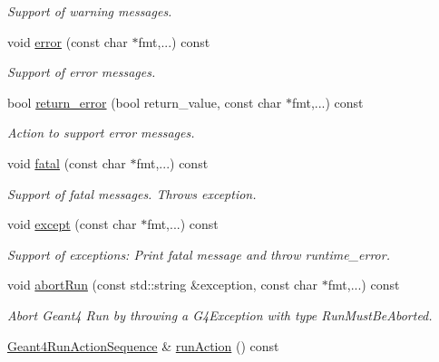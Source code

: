 \begin{DoxyCompactItemize}
\begin{DoxyCompactList}\small\item\em Support of warning messages. \end{DoxyCompactList}\item 
void \hyperlink{class_d_d4hep_1_1_simulation_1_1_geant4_action_a1abdae5d2d2af327f406697322b0d821}{error} (const char $\ast$fmt,...) const
\begin{DoxyCompactList}\small\item\em Support of error messages. \end{DoxyCompactList}\item 
bool \hyperlink{class_d_d4hep_1_1_simulation_1_1_geant4_action_a2f0ed49ced8246f3165476ed5866620a}{return\+\_\+error} (bool return\+\_\+value, const char $\ast$fmt,...) const
\begin{DoxyCompactList}\small\item\em Action to support error messages. \end{DoxyCompactList}\item 
void \hyperlink{class_d_d4hep_1_1_simulation_1_1_geant4_action_ab7efc61d1f82a99fd8011ab2a24bbc07}{fatal} (const char $\ast$fmt,...) const
\begin{DoxyCompactList}\small\item\em Support of fatal messages. Throws exception. \end{DoxyCompactList}\item 
void \hyperlink{class_d_d4hep_1_1_simulation_1_1_geant4_action_a9817394f45f311d2fb19f544e9a72e23}{except} (const char $\ast$fmt,...) const
\begin{DoxyCompactList}\small\item\em Support of exceptions\+: Print fatal message and throw runtime\+\_\+error. \end{DoxyCompactList}\item 
void \hyperlink{class_d_d4hep_1_1_simulation_1_1_geant4_action_a2773212a37fbe7b3187e79870a4d7f65}{abort\+Run} (const std\+::string \&exception, const char $\ast$fmt,...) const
\begin{DoxyCompactList}\small\item\em Abort Geant4 Run by throwing a G4\+Exception with type Run\+Must\+Be\+Aborted. \end{DoxyCompactList}\item 
\hyperlink{class_d_d4hep_1_1_simulation_1_1_geant4_run_action_sequence}{Geant4\+Run\+Action\+Sequence} \& \hyperlink{class_d_d4hep_1_1_simulation_1_1_geant4_action_a3d2a1a32cd7f6733c3553ce7723e6fb7}{run\+Action} () const

\end{DoxyCompactItemize}
